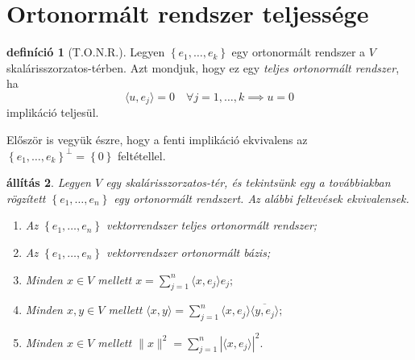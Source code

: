 \documentclass[a4paper, showtrims]{memoir}
\theoremstyle{plain}
\newtheorem{proposition}{állítás}[chapter]
\theoremstyle{remark}
\theoremstyle{definition}
\newtheorem{definition}[proposition]{definíció}
\newcommand{\ip}[2]{\langle#1,#2\rangle}
\begin{document}
\section{Ortonormált rendszer teljessége}
\begin{definition}[T.O.N.R.]
	Legyen $\left\{ e_1,\ldots,e_k \right\}$ egy ortonormált rendszer a $V$ skalárisszorzatos-térben.
	Azt mondjuk, hogy ez egy \emph{teljes ortonormált rendszer}, ha
	\[
		\ip{u}{e_j}=0\quad\forall j=1,\ldots,k \implies u=0
	\]
	implikáció teljesül.
\end{definition}
Először is vegyük észre, hogy a fenti implikáció ekvivalens az
$\left\{ e_1,\ldots,e_k \right\}^\perp =\left\{ 0 \right\}$
feltétellel.

\begin{proposition}
	Legyen $V$ egy skalárisszorzatos-tér,
	és tekintsünk egy a továbbiakban rögzített
	$\left\{ e_1,\ldots,e_n \right\}$ egy ortonormált rendszert.
	Az alábbi feltevések ekvivalensek.
	\begin{enumerate}
		\item
		      Az $\left\{ e_1,\ldots,e_n \right\}$ vektorrendszer teljes ortonormált rendszer;
		\item
		      Az $\left\{ e_1,\ldots,e_n \right\}$ vektorrendszer ortonormált bázis;
		\item
		      Minden $x\in V$ mellett
		      \(
		      x=
		      \sum_{j=1}^n\ip{x}{e_j}e_j;
		      \)
		\item
		      Minden $x,y\in V$ mellett
		      \(
		      \ip{x}{y}=
		      \sum_{j=1}^n\ip{x}{e_j}\overline{\ip{y}{e_j}};
		      \)
		\item
		      Minden $x\in V$ mellett
		      \(
		      \|x\|^2=
		      \sum_{j=1}^n|\ip{x}{e_j}|^2.
		      \)
		      \qedhere
	\end{enumerate}
\end{proposition}
\end{document}
